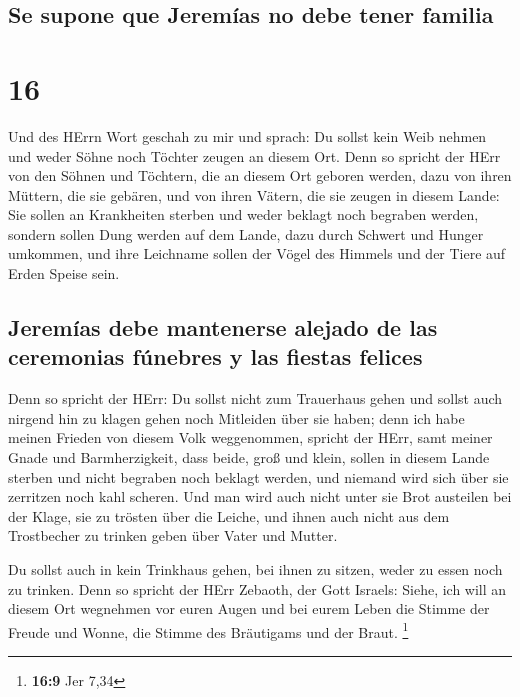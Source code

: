 \hypertarget{se-supone-que-jeremuxedas-no-debe-tener-familia}{%
\subsection{Se supone que Jeremías no debe tener
familia}\label{se-supone-que-jeremuxedas-no-debe-tener-familia}}

\hypertarget{section-15}{%
\section{16}\label{section-15}}

 Und des HErrn Wort geschah zu mir und sprach:
 Du sollst kein Weib nehmen und weder Söhne noch Töchter
zeugen an diesem Ort.  Denn so spricht der HErr von den
Söhnen und Töchtern, die an diesem Ort geboren werden, dazu von ihren
Müttern, die sie gebären, und von ihren Vätern, die sie zeugen in diesem
Lande:  Sie sollen an Krankheiten sterben und weder
beklagt noch begraben werden, sondern sollen Dung werden auf dem Lande,
dazu durch Schwert und Hunger umkommen, und ihre Leichname sollen der
Vögel des Himmels und der Tiere auf Erden Speise sein.

\hypertarget{jeremuxedas-debe-mantenerse-alejado-de-las-ceremonias-fuxfanebres-y-las-fiestas-felices}{%
\subsection{Jeremías debe mantenerse alejado de las ceremonias fúnebres
y las fiestas
felices}\label{jeremuxedas-debe-mantenerse-alejado-de-las-ceremonias-fuxfanebres-y-las-fiestas-felices}}

 Denn so spricht der HErr: Du sollst nicht zum Trauerhaus
gehen und sollst auch nirgend hin zu klagen gehen noch Mitleiden über
sie haben; denn ich habe meinen Frieden von diesem Volk weggenommen,
spricht der HErr, samt meiner Gnade und Barmherzigkeit, 
dass beide, groß und klein, sollen in diesem Lande sterben und nicht
begraben noch beklagt werden, und niemand wird sich über sie zerritzen
noch kahl scheren.  Und man wird auch nicht unter sie Brot
austeilen bei der Klage, sie zu trösten über die Leiche, und ihnen auch
nicht aus dem Trostbecher zu trinken geben über Vater und Mutter.

 Du sollst auch in kein Trinkhaus gehen, bei ihnen zu
sitzen, weder zu essen noch zu trinken.  Denn so spricht
der HErr Zebaoth, der Gott Israels: Siehe, ich will an diesem Ort
wegnehmen vor euren Augen und bei eurem Leben die Stimme der Freude und
Wonne, die Stimme des Bräutigams und der Braut. \footnote{\textbf{16:9}
  Jer 7,34}

